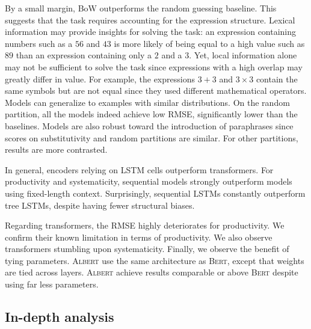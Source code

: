 By a small margin, BoW outperforms the random guessing baseline. This suggests that the task requires accounting for the expression structure. Lexical information may provide insights for solving the task: an expression containing numbers such as a $56$ and $43$ is more likely of being equal to a high value such as $89$ than an expression containing only a $2$ and a $3$. Yet, local information alone may not be sufficient to solve the task since expressions with a high overlap may greatly differ in value. For example, the expressions $3+3$ and $3\times3$ contain the same symbols but are not equal since they used different mathematical operators. 
Models can generalize to examples with similar distributions. On the random partition, all the models indeed achieve low RMSE, significantly lower than the baselines. Models are also robust toward the introduction of paraphrases since scores on substitutivity and random partitions are similar. For other partitions, results are more contrasted.

In general, encoders relying on LSTM cells outperform transformers. For productivity and systematicity, sequential models strongly outperform models using fixed-length context. Surprisingly, sequential LSTMs constantly outperform tree LSTMs, despite having fewer structural biases.

Regarding transformers, the RMSE highly deteriorates for productivity. We confirm their known limitation in terms of productivity. We also observe transformers stumbling upon systematicity. Finally, we observe the benefit of tying parameters. \textsc{Albert} use the same architecture as \textsc{Bert}, except that weights are tied across layers. \textsc{Albert} achieve results comparable or above \textsc{Bert} despite using far less parameters.

\subsection{In-depth analysis} 


